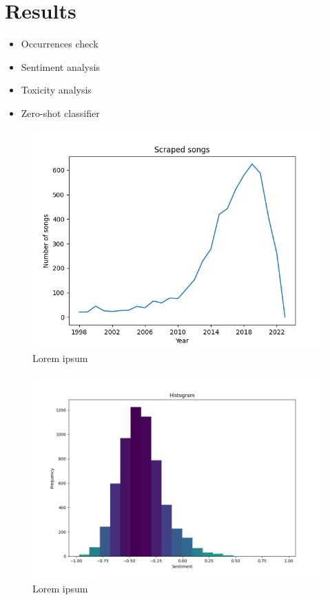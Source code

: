 \section{Results}\label{sec:results}

\begin{itemize}
    \item Occurrences check
    \item Sentiment analysis
    \item Toxicity analysis
    \item Zero-shot classifier
\end{itemize}

\begin{figure}[!htb]
    \centering
    \includegraphics[width=\textwidth]{figures/number_of_songs.png}
    \caption[]{Lorem ipsum}
\end{figure}

\begin{figure}[!htb]
    \centering
    \includegraphics[width=\textwidth]{figures/sentiment_histogram.png}
    \caption[]{Lorem ipsum}
\end{figure}


